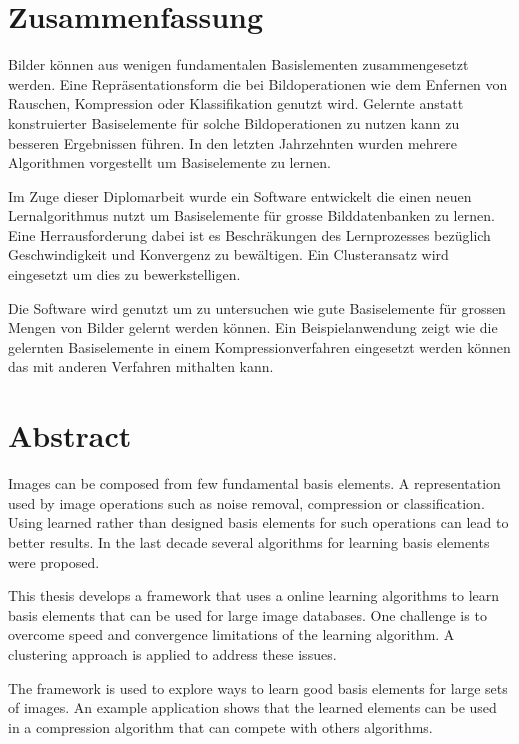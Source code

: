 \newpage
{}
{}
\chapter*{Zusammenfassung}
\thispagestyle{empty}

Bilder k\"{o}nnen aus wenigen fundamentalen Basislementen zusammengesetzt
werden.
Eine Repr\"asentationsform die bei Bildoperationen wie dem
Enfernen von Rauschen, Kompression oder Klassifikation genutzt wird.
Gelernte anstatt konstruierter Basiselemente f\"{u}r solche Bildoperationen zu
nutzen kann zu besseren Ergebnissen f\"{u}hren. In den letzten Jahrzehnten
wurden mehrere Algorithmen vorgestellt um Basiselemente zu lernen.

Im Zuge dieser Diplomarbeit wurde ein Software entwickelt die einen neuen
Lernalgorithmus nutzt um Basiselemente f\"ur grosse Bilddatenbanken
zu lernen. Eine Herrausforderung dabei ist es Beschr\"{a}kungen des
Lernprozesses bez\"{u}glich Geschwindigkeit und Konvergenz zu bew\"altigen. Ein
Clusteransatz wird eingesetzt um dies zu bewerkstelligen.

Die Software wird genutzt um zu untersuchen wie gute
Basiselemente f\"{u}r grossen Mengen von Bilder gelernt werden k\"{o}nnen.
Ein Beispielanwendung zeigt wie die gelernten Basiselemente in einem
Kompressionverfahren eingesetzt werden k\"{o}nnen das mit anderen Verfahren
mithalten kann.

\newpage
{}
{}
\chapter*{Abstract}
\thispagestyle{empty}

Images can be composed from few fundamental basis elements. 
A representation used by image operations such as noise removal,
compression or classification. Using learned rather than designed basis elements
for such operations can lead to better results. In the last decade several
algorithms for learning basis elements were proposed.

This thesis develops a framework that uses a online learning
algorithms to learn basis elements that can be used for large image
databases. One challenge is to overcome speed and convergence limitations of the
learning algorithm. A clustering approach is applied to address these issues. 

The framework is used to explore ways to learn good basis elements for
large sets of images. An example application shows that the learned elements
can be used in a compression algorithm that can compete with others algorithms.

